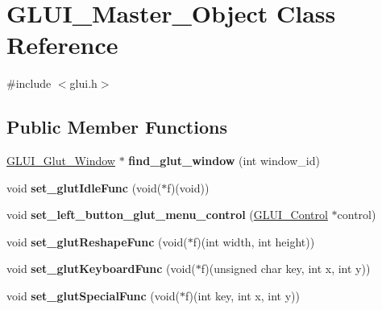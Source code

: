 \hypertarget{classGLUI__Master__Object}{\section{G\-L\-U\-I\-\_\-\-Master\-\_\-\-Object Class Reference}
\label{classGLUI__Master__Object}
}


{\ttfamily \#include $<$glui.\-h$>$}

\subsection*{Public Member Functions}
\begin{DoxyCompactItemize}
\item 
\hypertarget{classGLUI__Master__Object_a4f83ffb0d77f643fce91cfc962d5984c}{\hyperlink{classGLUI__Glut__Window}{G\-L\-U\-I\-\_\-\-Glut\-\_\-\-Window} $\ast$ {\bfseries find\-\_\-glut\-\_\-window} (int window\-\_\-id)}\label{classGLUI__Master__Object_a4f83ffb0d77f643fce91cfc962d5984c}

\item 
\hypertarget{classGLUI__Master__Object_a5d1b3a7cc294314dda9864cd7bd64a62}{void {\bfseries set\-\_\-glut\-Idle\-Func} (void($\ast$f)(void))}\label{classGLUI__Master__Object_a5d1b3a7cc294314dda9864cd7bd64a62}

\item 
\hypertarget{classGLUI__Master__Object_afb8aea4fc250cddb252570508acbd603}{void {\bfseries set\-\_\-left\-\_\-button\-\_\-glut\-\_\-menu\-\_\-control} (\hyperlink{classGLUI__Control}{G\-L\-U\-I\-\_\-\-Control} $\ast$control)}\label{classGLUI__Master__Object_afb8aea4fc250cddb252570508acbd603}

\item 
\hypertarget{classGLUI__Master__Object_aed8155ef565e847af72ba26478daa388}{void {\bfseries set\-\_\-glut\-Reshape\-Func} (void($\ast$f)(int width, int height))}\label{classGLUI__Master__Object_aed8155ef565e847af72ba26478daa388}

\item 
\hypertarget{classGLUI__Master__Object_aec70f38a81424a09c42f5a3e4e6edc43}{void {\bfseries set\-\_\-glut\-Keyboard\-Func} (void($\ast$f)(unsigned char key, int x, int y))}\label{classGLUI__Master__Object_aec70f38a81424a09c42f5a3e4e6edc43}

\item 
\hypertarget{classGLUI__Master__Object_a69ccd15bd0829ef1600de7026e6e903e}{void {\bfseries set\-\_\-glut\-Special\-Func} (void($\ast$f)(int key, int x, int y))}\label{classGLUI__Master__Object_a69ccd15bd0829ef1600de7026e6e903e}


\end{DoxyCompactItemize}
